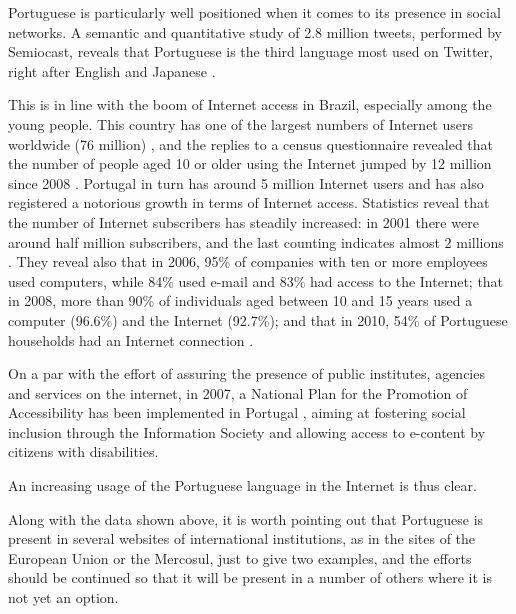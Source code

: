 \begin{multicols}{2}

Portuguese is particularly well positioned when it comes to its presence in social networks. A semantic and quantitative study of 2.8 million tweets, performed by Semiocast, reveals that Portuguese is the third language most used on Twitter, right after English and Japanese \cite{stat7}.

This is in line with the boom of Internet access in Brazil, especially among the young people. This country has one of the largest numbers of Internet users worldwide (76 million) \cite{statop20}, and the replies to a census questionnaire revealed that the number of people aged 10 or older using the Internet jumped by 12 million since 2008 \cite{mybroadband}. Portugal in turn has around 5 million Internet users \cite{stat4}  \cite{stat15} and has also registered a notorious growth in terms of Internet access. Statistics reveal that the number of Internet subscribers has steadily increased: in 2001 there were around half million subscribers, and the last counting indicates almost 2 millions \cite{pordata}.  
They reveal also that in 2006, 95\% of companies with ten or more employees used computers, while 84\% used e-mail and 83\% had access to the Internet;
that in 2008, more than 90\% of individuals aged between 10 and 15 years used a computer (96.6\%) and the Internet (92.7\%); 
and that in 2010, 54\% of Portuguese households had an Internet connection \cite{pordata}.

On a par with the effort of assuring the presence of public institutes, agencies and services on the internet, in 2007, a National Plan for the Promotion of Accessibility has been implemented in Portugal \cite{umic},  aiming at fostering social inclusion through the Information Society and allowing access to e-content by citizens with disabilities.

An increasing usage of the Portuguese language in the Internet is thus clear. 

Along with the data shown above, it is worth pointing out that Portuguese is present in several websites of international institutions, as in the sites of the European Union or the Mercosul, just to give two examples, and the efforts should be continued so that it will be present in a number of others where it is not yet an option.
\end{multicols}

